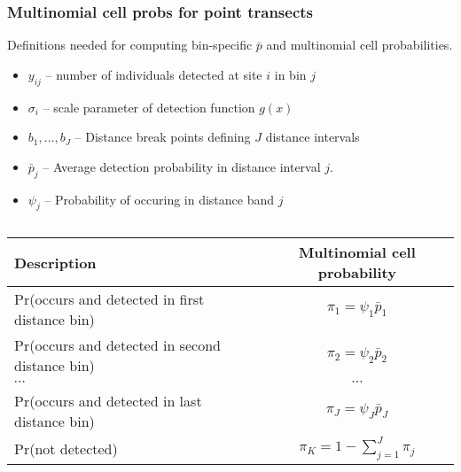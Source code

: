 \documentclass[color=usenames,dvipsnames]{beamer}\usepackage[]{graphicx}\usepackage[]{xcolor}
\begin{document}
\begin{frame}
  \frametitle{Multinomial cell probs for point transects}
  \small
  Definitions needed for computing \alert{bin-specific} $\bar{p}$ and
  multinomial cell probabilities. 
  \begin{itemize}
    \small
    \setlength\itemsep{1pt}
    \item $y_{ij}$ -- number of individuals detected at site $i$ in bin $j$
    \item $\sigma_i$ -- scale parameter of detection function $g(x)$
    \item $b_1, \dots, b_J$ -- Distance break points defining $J$
      distance intervals
    \item $\bar{p}_j$ -- Average detection probability in distance interval $j$.
    \item $\psi_j$ -- Probability of occuring in distance band $j$
  \end{itemize}
  \pause \vfill
  \footnotesize
  \begin{columns}
    \column{0.9\paperwidth}
    \begin{tabular}{lc}
      \hline
      \centering
      Description                       & Multinomial cell probability \\
      \hline
      Pr(occurs and detected in first distance bin)  & $\pi_1 = \psi_1\bar{p}_1$   \\
      Pr(occurs and detected in second distance bin)  & $\pi_2 = \psi_2\bar{p}_2$   \\
      {\centering $\cdots$}             & $\cdots$                     \\
      Pr(occurs and detected in last distance bin)  & $\pi_J = \psi_J\bar{p}_J$   \\
      Pr(not detected)                  & $\pi_{K} = 1-\sum_{j=1}^J \pi_j$          \\
      \hline
    \end{tabular}
  \end{columns}
\end{frame}
\end{document}

